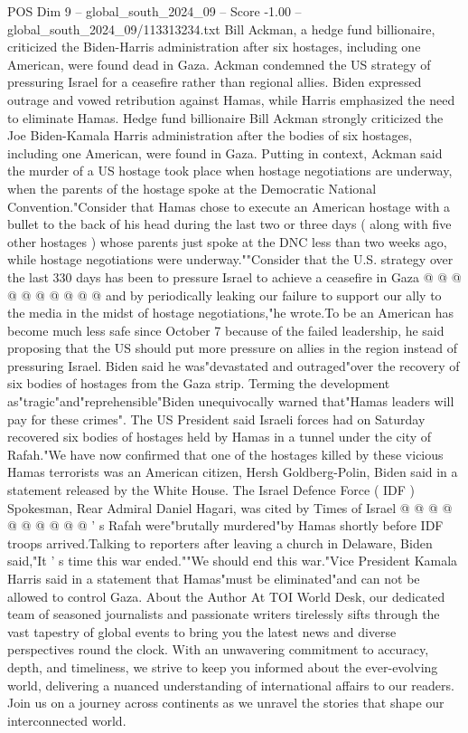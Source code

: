 \begin{textsample}{POS Dim 9 – global\_south\_2024\_09 – Score -1.00 – global\_south\_2024\_09/113313234.txt}  \label{ex:f9_pos_260}
Bill Ackman, a hedge fund billionaire, criticized the Biden-Harris administration after six hostages, including one American, were found dead in Gaza.
Ackman condemned the US strategy of pressuring Israel for a ceasefire rather than regional allies.
Biden expressed outrage and vowed retribution against Hamas, while Harris emphasized the need to eliminate Hamas.
Hedge fund billionaire Bill Ackman strongly criticized the Joe Biden-Kamala Harris administration after the bodies of six hostages, including one American, were found in Gaza.
Putting in context, Ackman said the murder of a US hostage took place when hostage negotiations are underway, when the parents of the hostage spoke at the Democratic National Convention."Consider that Hamas chose to execute an American hostage with a bullet to the back of his head during the last two or three days ( along with five other hostages ) whose parents just spoke at the DNC less than two weeks ago, while hostage negotiations were underway.""Consider that the U.S. strategy over the last 330 days has been to pressure Israel to achieve a ceasefire in Gaza @ @ @ @ @ @ @ @ @ @ and by periodically leaking our failure to support our ally to the media in the midst of hostage negotiations,"he wrote.To be an American has become much less safe since October 7 because of the failed leadership, he said proposing that the US should put more pressure on allies in the region instead of pressuring Israel.
Biden said he was"devastated and outraged"over the recovery of six bodies of hostages from the Gaza strip.
Terming the development as"tragic"and"reprehensible"Biden unequivocally warned that"Hamas leaders will pay for these crimes".
The US President said Israeli forces had on Saturday recovered six bodies of hostages held by Hamas in a tunnel under the city of Rafah."We have now confirmed that one of the hostages killed by these vicious Hamas terrorists was an American citizen, Hersh Goldberg-Polin, Biden said in a statement released by the White House.
The Israel Defence Force ( IDF ) Spokesman, Rear Admiral Daniel Hagari, was cited by Times of Israel @ @ @ @ @ @ @ @ @ @ ' s Rafah were"brutally murdered"by Hamas shortly before IDF troops arrived.Talking to reporters after leaving a church in Delaware, Biden said,"It ' s time this war ended.""We should end this war."Vice President Kamala Harris said in a statement that Hamas"must be eliminated"and can not be allowed to control Gaza.
About the Author At TOI World Desk, our dedicated team of seasoned journalists and passionate writers tirelessly sifts through the vast tapestry of global events to bring you the latest news and diverse perspectives round the clock.
With an unwavering commitment to accuracy, depth, and timeliness, we strive to keep you informed about the ever-evolving world, delivering a nuanced understanding of international affairs to our readers.
Join us on a journey across continents as we unravel the stories that shape our interconnected world.

\end{textsample}
